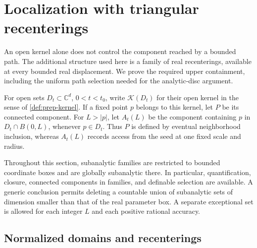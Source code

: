 \section{Localization with triangular recenterings}
\label{sec:loc-section}

An open kernel alone does not control the component reached by a bounded path.  The additional structure used here is a family of real recenterings, available at every bounded real displacement.  We prove the required upper containment, including the uniform path selection needed for the analytic-disc argument.

\label{loc:kernel}
For open sets $D_t\subset\mathbb{C}^d$, $0<t<t_0$, write $\mathcal{K}(D_t)$ for their open kernel in the sense of \cref{def:prep-kernel}. If a fixed point $p$ belongs to this kernel, let $P$ be its connected component.  For $L>|p|$, let $A_t(L)$ be the component containing $p$ in $D_t\cap B(0,L)$, whenever $p\in D_t$.  Thus $P$ is defined by eventual neighborhood inclusion, whereas $A_t(L)$ records access from the seed at one fixed scale and radius.

Throughout this section, subanalytic families are restricted to bounded coordinate boxes and are globally subanalytic there.  In particular, quantification, closure, connected components in families, and definable selection are available.  A generic conclusion permits deleting a countable union of subanalytic sets of dimension smaller than that of the real parameter box.  A separate exceptional set is allowed for each integer $L$ and each positive rational accuracy.

\subsection{Normalized domains and recenterings}

